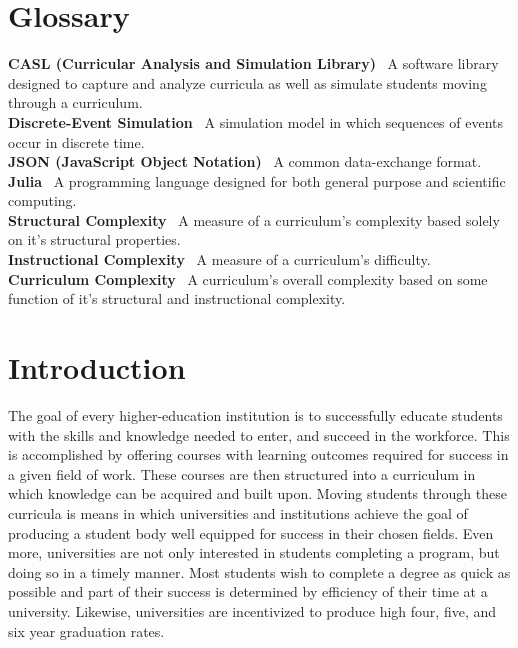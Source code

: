 \documentclass[botnum, fleqn]{unmeethesis}
\begin{document}
\tableofcontents
\listoffigures


\chapter{Glossary}
  \textbf{CASL (Curricular Analysis and Simulation Library)} \ A software library designed to capture and analyze curricula as well as simulate students moving through a curriculum. \\
  \textbf{Discrete-Event Simulation} \ A simulation model in which sequences of events occur in discrete time. \\
  \textbf{JSON (JavaScript Object Notation)} \ A common data-exchange format. \\
  \textbf{Julia} \ A programming language designed for both general purpose and scientific computing. \\
  \textbf{Structural Complexity} \ A measure of a curriculum's complexity based solely on it's structural properties. \\
  \textbf{Instructional Complexity} \ A measure of a curriculum's difficulty. \\
  \textbf{Curriculum Complexity} \ A curriculum's overall complexity based on some function of it's structural and instructional complexity. \\


\mainmatter


\chapter{Introduction}
  The goal of every higher-education institution is to successfully educate students with the skills and knowledge needed to enter, and succeed in the workforce. This is accomplished by offering courses with learning outcomes required for success in a given field of work. These courses are then structured into a curriculum in which knowledge can be acquired and built upon. Moving students through these curricula is means in which universities and institutions achieve the goal of producing a student body well equipped for success in their chosen fields. Even more, universities are not only interested in students completing a program, but doing so in a timely manner. Most students wish to complete a degree as quick as possible and part of their success is determined by efficiency of their time at a university. Likewise, universities are incentivized to produce high four, five, and six year graduation rates.
\end{document}
